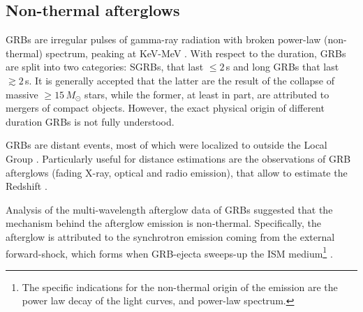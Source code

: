 \subsection{Non-thermal afterglows}

\acp{GRB} are irregular pulses of gamma-ray radiation with broken power-law 
(non-thermal) spectrum, peaking at KeV-MeV \citep{Band:1993,Kouveliotou:1993,Meegan:1992xg}.
%
With respect to the duration, \acp{GRB} are split into two categories: \acp{SGRB}, 
that last ${\leq}2\,$s and long \acp{GRB} that last ${\gtrsim}2\,$s. 
%
It is generally accepted that the latter are the 
result of the collapse of massive ${\geq}15\,M_{\odot}$ stars,
 while the former, at least in part, are attributed to mergers of compact objects. 
%
However, the exact physical origin of different duration 
\acp{GRB} is not fully understood.
%

\acp{GRB} are distant events, most of which were localized to outside the Local Group 
\citep[\eg][]{Mao:1992,Piran:1992,Fenimore:1993}. 
%
Particularly useful for distance estimations are the observations of \ac{GRB} afterglows 
(fading X-ray, optical and radio emission), 
that allow to estimate the Redshift \citep[\eg][]{Costa:1997cg,Frontera:1997ae}.

Analysis of the multi-wavelength afterglow data of \acp{GRB} 
\citep[\eg][]{Panaitescu:2001bx} suggested that the mechanism behind the afterglow 
emission is non-thermal. Specifically, the afterglow is attributed to the 
synchrotron emission coming from the external forward-shock, which forms 
when \ac{GRB}-ejecta sweeps-up the \ac{ISM} medium\footnote{
    The specific indications for the non-thermal origin of the emission 
    are the power law decay of the light curves, and power-law spectrum. 
} 
\citep{Rees:1992ek,Paczynski:1993gz,Meszaros:1993ju,Meszaros:1996sv}.
%

